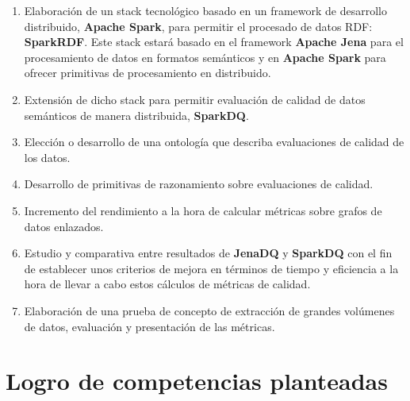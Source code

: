 \begin{enumerate}
  \item Elaboración de un stack tecnológico basado en un framework de desarrollo
    distribuido, \textbf{Apache Spark}, para permitir el procesado de datos RDF:
    \textbf{SparkRDF}. Este stack estará basado en el framework \textbf{Apache
      Jena} para el procesamiento de datos en formatos semánticos y en
    \textbf{Apache Spark} para ofrecer primitivas de procesamiento en
    distribuido.
  \item Extensión de dicho stack para permitir evaluación de calidad de datos
    semánticos de manera distribuida, \textbf{SparkDQ}.
  \item Elección o desarrollo de una ontología que describa evaluaciones de
    calidad de los datos.
  \item Desarrollo de primitivas de razonamiento sobre evaluaciones de
    calidad.
  \item Incremento del rendimiento a la hora de calcular métricas sobre
    grafos de datos enlazados.
  \item Estudio y comparativa entre resultados de \textbf{JenaDQ} y
    \textbf{SparkDQ} con el fin de establecer unos criterios de mejora
    en términos de tiempo y eficiencia a la hora de llevar a cabo
    estos cálculos de métricas de calidad.
  \item Elaboración de una prueba de concepto de extracción de
    grandes volúmenes de datos, evaluación y presentación de las
    métricas.
\end{enumerate}


\section{Logro de competencias planteadas}

